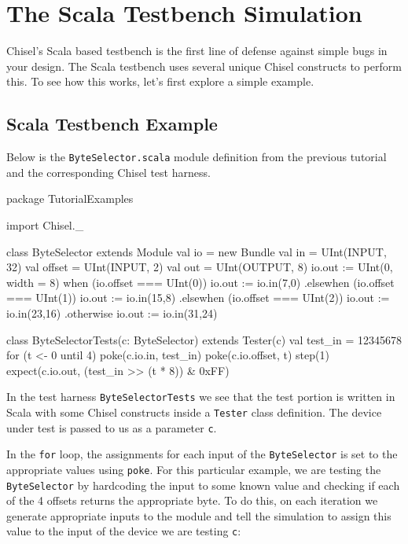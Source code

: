 \section{The Scala Testbench Simulation}

Chisel's Scala based testbench is the first line of defense against simple bugs in your design. The Scala testbench uses several unique Chisel constructs to perform this. To see how this works, let's first explore a simple example.

\subsection{Scala Testbench Example}

Below is the \verb+ByteSelector.scala+ module definition from the previous tutorial and the corresponding Chisel test harness.

\begin{scala}
package TutorialExamples

import Chisel._

class ByteSelector extends Module {
  val io = new Bundle {
    val in     = UInt(INPUT, 32)
    val offset = UInt(INPUT, 2)
    val out    = UInt(OUTPUT, 8)
  }
  io.out := UInt(0, width = 8)
  when (io.offset === UInt(0)) {
    io.out := io.in(7,0)
  } .elsewhen (io.offset === UInt(1)) {
    io.out := io.in(15,8)
  } .elsewhen (io.offset === UInt(2)) {
    io.out := io.in(23,16)
  } .otherwise {
    io.out := io.in(31,24)
  }    
}

class ByteSelectorTests(c: ByteSelector) 
    extends Tester(c) {
  val test_in = 12345678
  for (t <- 0 until 4) {
    poke(c.io.in,     test_in)
    poke(c.io.offset, t)
    step(1)
    expect(c.io.out, (test_in >> (t * 8)) & 0xFF)
  }
}
\end{scala}

In the test harness \verb+ByteSelectorTests+ we see that the test portion is written in Scala with some Chisel constructs inside a \verb+Tester+ class definition. The device under test is passed to us as a parameter \verb+c+. 

In the \verb+for+ loop, the assignments for each input of the \verb+ByteSelector+ is set to the appropriate values using \verb+poke+. For this particular example, we are testing the \verb+ByteSelector+ by hardcoding the input to some known value and checking if each of the 4 offsets returns the appropriate byte. To do this, on each iteration we generate appropriate inputs to the module and tell the simulation to assign this value to the input of the device we are testing \verb+c+:

